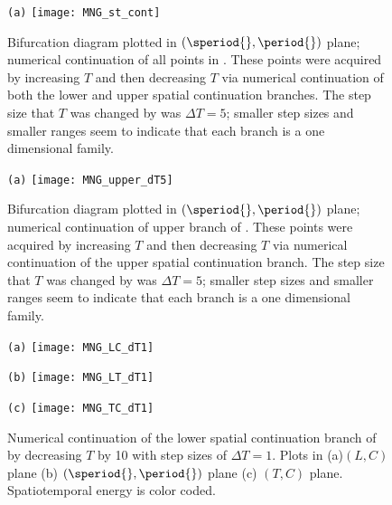 \begin{itemize}
\begin{figure}
\begin{minipage}[height=.20\textheight]{.8\textwidth}
\centering \small{\texttt{(a)}}
\texttt{[image: MNG\_st\_cont]}
\end{minipage}
\caption{ \label{fig:MNG_hook_st_cont}
Bifurcation diagram plotted in $(\speriod{},\period{})$ plane; numerical continuation of all points in .
These points were acquired by increasing $T$ and then decreasing $T$ via numerical continuation of both the lower and upper spatial continuation branches. The step size that $T$ was changed by was $\Delta T = 5$; smaller step sizes and smaller ranges seem to indicate that each branch is a one dimensional family.
}
\end{figure}

\begin{figure}
\begin{minipage}[height=.20\textheight]{.8\textwidth}
\centering \small{\texttt{(a)}}
\texttt{[image: MNG\_upper\_dT5]}
\end{minipage}
\caption{ \label{fig:MNG_upper_dT5}
Bifurcation diagram plotted in $(\speriod{},\period{})$ plane; numerical continuation of upper branch of .
These points were acquired by increasing $T$ and then decreasing $T$ via numerical continuation of the upper spatial continuation branch. The step size that $T$ was changed by was $\Delta T = 5$; smaller step sizes and smaller ranges seem to indicate that each branch is a one dimensional family.
}
\end{figure}


\begin{figure}
\begin{minipage}[height=.20\textheight]{.30\textwidth}
\centering \small{\texttt{(a)}}
\texttt{[image: MNG\_LC\_dT1]}
\end{minipage}
\begin{minipage}[height=.20\textheight]{.30\textwidth}
\centering \small{\texttt{(b)}}
\texttt{[image: MNG\_LT\_dT1]}
\end{minipage}
\begin{minipage}[height=.20\textheight]{.30\textwidth}
\centering \small{\texttt{(c)}}
\texttt{[image: MNG\_TC\_dT1]}
\end{minipage}
\caption{ \label{fig:MNG_lower_dT1}
Numerical continuation of the lower spatial continuation branch of
 by decreasing $T$ by 10 with step
sizes of $\Delta T = 1$. Plots in (a)$(L,C)$ plane (b) $(\speriod{},\period{})$ plane
(c) $(T,C)$ plane. Spatiotemporal energy is color coded.
}
\end{figure}


\end{itemize}
